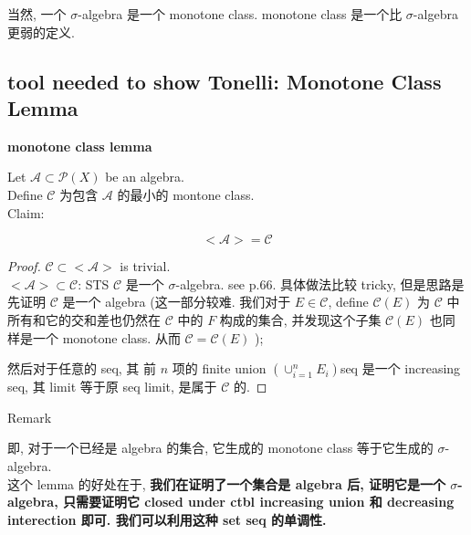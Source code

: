 \documentclass{qlnotes-export}
\begin{document}
当然, 一个 \(\sigma\)-algebra 是一个 monotone class. monotone class 是一个比 \(\sigma\)-algebra 更弱的定义.

\subsection{tool needed to show Tonelli: Monotone Class Lemma}\label{tool-needed-to-show-tonelli-monotone-class-lemma}

\begin{lemma}{\protect{}\label{kn-monotone-class-lemma}{\textbf{monotone
class lemma}}}

Let \(\mathcal{A} \subset \mathcal{P}(X)\) be an algebra.\\
Define \(\mathcal{C}\) 为包含 \(\mathcal{A}\) 的最小的 montone class.\\
Claim:

\[< \mathcal{A} > = \mathcal{C}\]

\end{lemma}

\begin{proof}

\(\mathcal{C} \subset < \mathcal{A} >\) is trivial.\\
\(< \mathcal{A} > \subset \mathcal{C}\): STS \(\mathcal{C}\) 是一个 \(\sigma\)-algebra. see p.66. 具体做法比较 tricky, 但是思路是先证明 \(\mathcal{C}\) 是一个 algebra (这一部分较难. 我们对于 \(E \in \mathcal{C}\), define \(\mathcal{C}(E)\) 为 \(\mathcal{C}\) 中所有和它的交和差也仍然在 \(\mathcal{C}\) 中的 \(F\) 构成的集合, 并发现这个子集 \(\mathcal{C}(E)\) 也同样是一个 monotone class. 从而 \(\mathcal{C} = \mathcal{C}(E)\) );

然后对于任意的 seq, 其 前 \(n\) 项的 finite union \(( \cup_{i = 1}^{n}E_{i})\)seq 是一个 increasing seq, 其 limit 等于原 seq limit, 是属于 \(\mathcal{C}\) 的.

\end{proof}

\begin{qlremark}{Remark}

即, 对于一个已经是 algebra 的集合, 它生成的 monotone class 等于它生成的 \(\sigma\)-algebra.\\
这个 lemma 的好处在于, \textbf{我们在证明了一个集合是 algebra 后, 证明它是一个 \(\sigma\)-algebra, 只需要证明它 closed under ctbl increasing union 和 decreasing interection 即可. 我们可以利用这种 set seq 的单调性.}

\end{qlremark}
\end{document}
